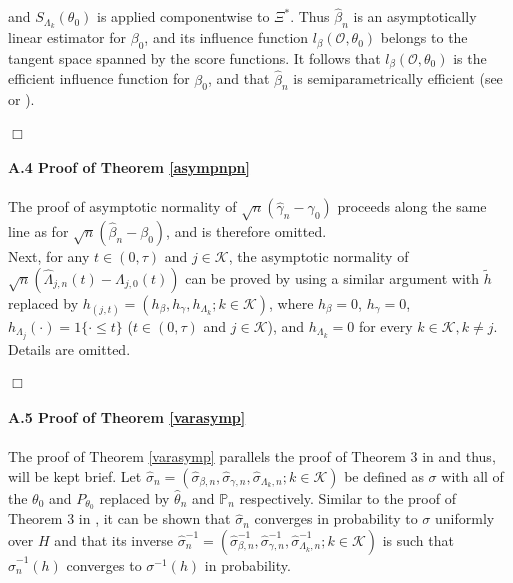 \documentclass{statsoc}
\begin{document}
and $S_{\Lambda_k}(\theta_0)$ is applied componentwise to $\Xi^\ast$. Thus $\widehat\beta_n$ is an asymptotically linear estimator for $\beta_0$, and its influence function $l_\beta(\mathcal O, \theta_0)$ belongs to the tangent space spanned by the score functions. It follows that $l_\beta(\mathcal O, \theta_0)$ is the efficient influence function for $\beta_0$, and that $\widehat\beta_n$ is semiparametrically efficient (see \cite{bkrw} or \cite{tsi06}).
\\
\\
$\Box$
\\
\\
\textbf{A.4 Proof of Theorem \ref{asympnpn}}
\\
\\
The proof of asymptotic normality of $\sqrt n(\widehat\gamma_n-\gamma_0)$ proceeds along the same line as for $\sqrt n(\widehat\beta_n-\beta_0)$, and is therefore omitted.
\\
Next, for any $t\in(0,\tau)$ and $j\in\mathcal K$, the asymptotic normality of $\sqrt n(\widehat\Lambda_{j,n}(t)-\Lambda_{j,0}(t))$ can be proved by using a similar argument with $\widetilde h$ replaced by $h_{(j,t)}=(h_\beta, h_\gamma, h_{\Lambda_k}; k\in\mathcal K)$, where $h_\beta=0$, $h_\gamma=0$, $h_{\Lambda_j}(\cdot)=1\{\cdot\leq t\}$ ($t\in(0,\tau)$ and $j\in\mathcal K$), and $h_{\Lambda_k}=0$ for every $k\in\mathcal K, k\neq j$. Details are omitted.
\\
\\
$\Box$
\\
\\
\textbf{A.5 Proof of Theorem \ref{varasymp}}
\\\\
The proof of Theorem \ref{varasymp} parallels the proof of Theorem 3 in \cite{parner} and thus, will be kept brief. Let $\widehat \sigma_n=(\widehat \sigma_{\beta,n}, \widehat \sigma_{\gamma,n}, \widehat \sigma_{\Lambda_k,n}; k \in \mathcal K)$ be defined as  $\sigma$ with all of the $\theta_0$ and $P_{\theta_0}$ replaced by $\widehat\theta_n$ and $\mathbb P_n$ respectively. Similar to the proof of Theorem 3 in \cite{parner}, it can be shown that $\widehat\sigma_n$ converges in probability to $\sigma$ uniformly over $H$ and that its inverse $\widehat \sigma_n^{-1}=(\widehat \sigma_{\beta,n}^{-1}, \widehat \sigma_{\gamma,n}^{-1}, \widehat \sigma_{\Lambda_k,n}^{-1}; k \in \mathcal K)$ is such that $\widehat \sigma_n^{-1}(h)$ converges to $\sigma^{-1}(h)$ in probability.
\end{document}
